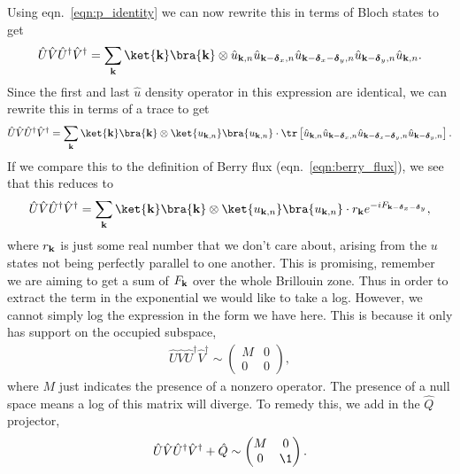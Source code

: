 Using eqn.~\ref{eqn:p_identity} we can now rewrite this in terms of Bloch states to get
\begin{align}
	\hat U\hat V\hat U^\dag \hat V^\dag = \sum_{\textbf k} \ket{\textbf k } \bra{\textbf k } \otimes  \hat u_{\textbf k, n}  \hat u_{\textbf k -\boldsymbol{\delta}_x , n}  \hat u_{\textbf k-\boldsymbol{\delta}_x-\boldsymbol{\delta}_y, n}  \hat u_{\textbf k-\boldsymbol{\delta}_y, n}  \hat u_{\textbf k, n}.
\end{align}
Since the first and last $\hat u$ density operator in this expression are identical, we can rewrite this in terms of a trace to get
\begin{align}
	\hat U\hat V\hat U^\dag \hat V^\dag = \sum_{\textbf k} \ket{\textbf k } \bra{\textbf k } \otimes  \ket {u_{\textbf k, n}} \bra{u_{\textbf k, n}} \cdot  \tr \left [ \hat u_{\textbf k, n} \hat u_{\textbf k -\boldsymbol{\delta}_x , n}  \hat u_{\textbf k-\boldsymbol{\delta}_x-\boldsymbol{\delta}_y, n}  \hat u_{\textbf k-\boldsymbol{\delta}_y, n} \right ].
\end{align}
If we compare this to the definition of Berry flux (eqn.~\ref{eqn:berry_flux}), we see that this reduces to
\begin{align}
	\hat U\hat V\hat U^\dag \hat V^\dag = \sum_{\textbf k} \ket{\textbf k } \bra{\textbf k } \otimes  \ket {u_{\textbf k, n}} \bra{u_{\textbf k, n}} \cdot r_{\textbf k} e^{-i F_{\textbf k-\boldsymbol{\delta}_x-\boldsymbol{\delta}_y}},
\end{align}
where $r_{\textbf k}$ is just some real number that we don't care about, arising from the $u$ states not being perfectly parallel to one another. This is promising, remember we are aiming to get a sum of $F_{\textbf k}$ over the whole Brillouin zone. Thus in order to extract the term in the exponential we would like to take a log. However, we cannot simply log the expression in the form we have here. This is because it only has support on the occupied subspace,
\begin{align}
    \hat U\hat V\hat U^\dag \hat V^\dag \sim \begin{pmatrix}
M &0 \\ 
 0& 0
\end{pmatrix},
\end{align}
where $M$ just indicates the presence of a nonzero operator. The presence of a null space means a log of this matrix will diverge. To remedy this, we add in the $\hat Q$ projector, 
\begin{align}
    \hat U\hat V\hat U^\dag \hat V^\dag  + \hat Q \sim \begin{pmatrix}
M &0 \\ 
 0& \1
\end{pmatrix}.
\end{align}
